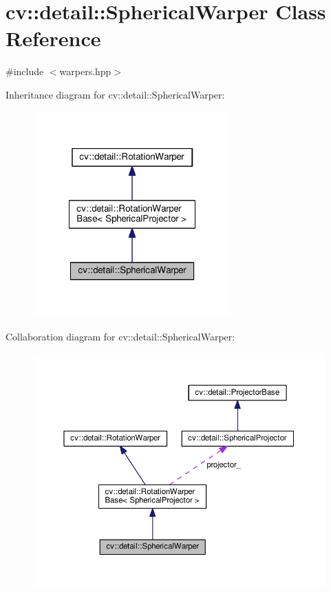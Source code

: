 \hypertarget{classcv_1_1detail_1_1SphericalWarper}{\section{cv\-:\-:detail\-:\-:Spherical\-Warper Class Reference}
\label{classcv_1_1detail_1_1SphericalWarper}
}


{\ttfamily \#include $<$warpers.\-hpp$>$}



Inheritance diagram for cv\-:\-:detail\-:\-:Spherical\-Warper\-:\nopagebreak
\begin{figure}[H]
\begin{center}
\leavevmode
\includegraphics[width=216pt]{classcv_1_1detail_1_1SphericalWarper__inherit__graph}
\end{center}
\end{figure}


Collaboration diagram for cv\-:\-:detail\-:\-:Spherical\-Warper\-:\nopagebreak
\begin{figure}[H]
\begin{center}
\leavevmode
\includegraphics[width=350pt]{classcv_1_1detail_1_1SphericalWarper__coll__graph}
\end{center}
\end{figure}
